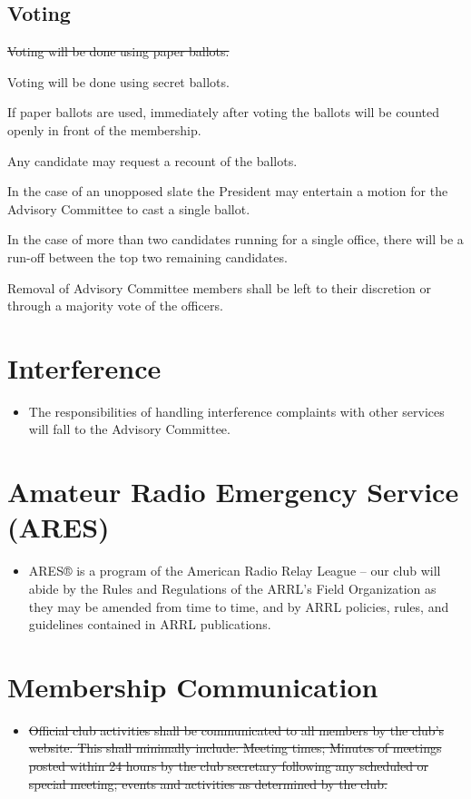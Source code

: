 \documentclass{article}
\begin{document}
\subsection{Voting}
\begin{itemize}
{\color{red} \item  \sout{Voting will be done using paper ballots.}}
{\color{blue} \item Voting will be done using secret ballots.}

{\color{blue} \item If paper ballots are used, immediately after voting the ballots will be counted openly in front of the membership.}

\item Any candidate may request a recount of the ballots.

\item In the case of an unopposed slate the President may entertain a motion for the Advisory Committee to cast a single ballot.

\item In the case of more than two candidates running for a single office, there will be a run-off between the top two remaining candidates.  

\item Removal of Advisory Committee members shall be left to their discretion or through a majority vote of the officers.
\end{itemize}

\section{Interference}
\begin{itemize}
\item The responsibilities of handling interference complaints with other services will fall to the Advisory Committee.
\end{itemize}

\section{Amateur Radio Emergency Service (ARES)}
\begin{itemize}
\item ARES® is a program of the American Radio Relay League -- our club will abide by the Rules and Regulations of the ARRL’s Field Organization as they may be amended from time to time, and by ARRL policies, rules, and guidelines contained in ARRL publications.
\end{itemize}


{\color{red} 
\section{Membership Communication}
\begin{itemize}
\item \sout{ Official club activities shall be communicated to all members by the club's website.  This shall minimally include: Meeting times; Minutes of meetings posted within 24 hours by the club secretary following any scheduled or special meeting; events and activities as determined by the club.
}
\end{itemize}
}
\end{document}
